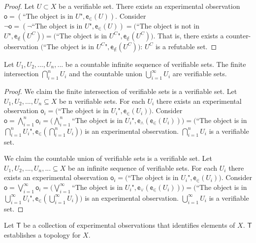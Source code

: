 \documentclass[11pt,letterpaper,fleqn]{memoir} %
\begin{document}
\begin{proof}
	Let $U\subset X$ be a verifiable set. There exists an experimental observation $\mathsf{o} = (\text{``The object is in } U \text{"}, \mathsf{e}_\in(U))$. Consider $\neg \mathsf{o} = (\neg \text{``The object is in } U \text{"}, \mathsf{e}_\in(U)) = ($``The object  is not in $ U \text{"}, \mathsf{e}_{\notin}(U^C)) = ($``The object  is in $ U^C \text{"}, \mathsf{e}_{\notin}(U^C))$. That is, there exists a counter-observation $($``The object  is in $ U^C \text{"}, \mathsf{e}_{\notin}(U^C))$: $U^C$ is a refutable set.
\end{proof}

\begin{prop}
	Let $U_1, U_2, ... , U_n, ...$ be a countable infinite sequence of verifiable sets. The finite intersection $\bigcap\limits_{i=1}^{n} U_i$ and the countable union  $\bigcup\limits_{i=1}^{\infty} U_i$ are verifiable sets.
\end{prop}

\begin{proof}
	We claim the finite intersection of verifiable sets is a verifiable set. Let $U_1, U_2, ... , U_n \subseteq X$ be n verifiable sets. For each $U_i$ there exists an experimental observation $\mathsf{o}_i = ($``The object is in $ U_i \text{"}, \mathsf{e}_\in(U_i))$. Consider $\mathsf{o} = \bigwedge\limits_{i=1}^{n} \mathsf{o}_i = (\bigwedge\limits_{i=1}^{n} $``The object is in $ U_i \text{"}, \mathsf{e}_{\wedge}(\mathsf{e}_\in(U_i)))=( $``The object is in $ \bigcap\limits_{i=1}^{n} U_i \text{"}, \mathsf{e}_\in(\bigcap\limits_{i=1}^{n} U_i))$ is an experimental observation. $\bigcap\limits_{i=1}^{n} U_i$ is a verifiable set.
	
	We claim the countable union of verifiable sets is a verifiable set. Let $U_1, U_2, ... , U_n, ... \subseteq X$ be an infinite sequence of verifiable sets. For each $U_i$ there exists an experimental observation $\mathsf{o}_i = ($``The object is in $ U_i \text{"}, \mathsf{e}_\in(U_i))$. Consider $\mathsf{o} = \bigvee\limits_{i=1}^{\infty} \mathsf{o}_i = (\bigvee\limits_{i=1}^{\infty} $``The object is in $ U_i \text{"}, \mathsf{e}_{\vee}(\mathsf{e}_\in(U_i)))=( $``The object is in $ \bigcup\limits_{i=1}^{\infty} U_i \text{"}, \mathsf{e}_\in(\bigcup\limits_{i=1}^{\infty} U_i))$ is an experimental observation. $\bigcup\limits_{i=1}^{\infty} U_i$ is a verifiable set.
\end{proof}

\begin{stmt}
	Let $\mathsf{T}$ be a collection of experimental observations that identifies elements of $X$. $\mathsf{T}$ establishes a topology for $X$.
\end{stmt}
\end{document}

